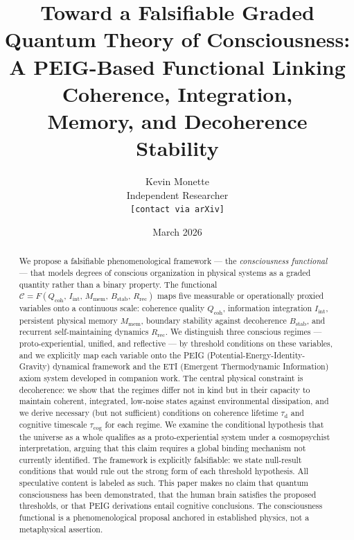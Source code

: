 \documentclass[12pt,letterpaper]{article}
\newcommand{\Cfunc}{\mathcal{C}}
\newcommand{\Qcoh}{Q_{\mathrm{coh}}}
\newcommand{\Iint}{I_{\mathrm{int}}}
\newcommand{\Mmem}{M_{\mathrm{mem}}}
\newcommand{\Bstab}{B_{\mathrm{stab}}}
\newcommand{\Rrec}{R_{\mathrm{rec}}}
\newcommand{\taud}{\tau_{\mathrm{d}}}
\newcommand{\taucog}{\tau_{\mathrm{cog}}}
\begin{document}
\title{\textbf{Toward a Falsifiable Graded Quantum Theory of Consciousness:\\
A PEIG-Based Functional Linking Coherence, Integration,\\
Memory, and Decoherence Stability}}

\author{
  Kevin Monette\\
  \small Independent Researcher\\[4pt]
  \small\texttt{[contact via arXiv]}
}

\date{March 2026}

\maketitle

\begin{abstract}
We propose a falsifiable phenomenological framework --- the \emph{consciousness
functional} --- that models degrees of conscious organization in physical
systems as a graded quantity rather than a binary property. The functional
$\Cfunc = F(\Qcoh,\,\Iint,\,\Mmem,\,\Bstab,\,\Rrec)$ maps five measurable
or operationally proxied variables onto a continuous scale: coherence quality
$\Qcoh$, information integration $\Iint$, persistent physical memory $\Mmem$,
boundary stability against decoherence $\Bstab$, and recurrent self-maintaining
dynamics $\Rrec$. We distinguish three conscious regimes --- proto-experiential,
unified, and reflective --- by threshold conditions on these variables,
and we explicitly map each variable onto the PEIG (Potential-Energy-Identity-Gravity)
dynamical framework and the ETI (Emergent Thermodynamic Information) axiom system
developed in companion work. The central physical constraint is decoherence:
we show that the regimes differ not in kind but in their capacity to maintain
coherent, integrated, low-noise states against environmental dissipation,
and we derive necessary (but not sufficient) conditions on coherence lifetime
$\taud$ and cognitive timescale $\taucog$ for each regime. We examine the
conditional hypothesis that the universe as a whole qualifies as a proto-experiential
system under a cosmopsychist interpretation, arguing that this claim requires a
global binding mechanism not currently identified. The framework is explicitly
falsifiable: we state null-result conditions that would rule out the strong form
of each threshold hypothesis. All speculative content is labeled as such.
This paper makes no claim that quantum consciousness has been demonstrated,
that the human brain satisfies the proposed thresholds, or that PEIG derivations
entail cognitive conclusions. The consciousness functional is a phenomenological
proposal anchored in established physics, not a metaphysical assertion.
\end{abstract}
\end{document}
